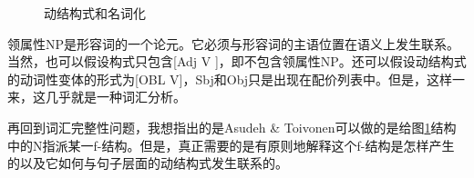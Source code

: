 \begin{figure}
\centering
{}
\caption{\label{Abbildung-Resultativkonstruktion-Nominalisierung-Construction}动结构式和名词化}
\end{figure}%
领属性NP是形容词的一个论元。它必须与形容词的主语位置在语义上发生联系。当然，也可以假设构式只包含[Adj V ]，即不包含领属性NP。还可以假设动结构式的动词性变体的形式为[OBL V]，Sbj和Obj只是出现在配价列表中。但是，这样一来，这几乎就是一种词汇分析。

    再回到词汇完整性问题，我想指出的是Asudeh \& Toivonen可以做的是给图\ref{Abbildung-Resultativkonstruktion-Nominalisierung-Construction}结构中的N指派某一f-结构。但是，真正需要的是有原则地解释这个f-结构是怎样产生的以及它如何与句子层面的动结构式发生联系的。

